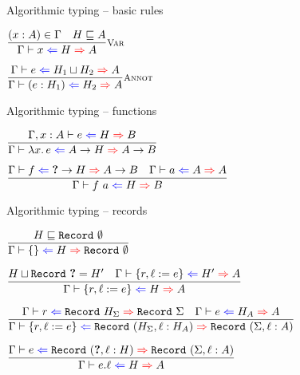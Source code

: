 \documentclass{beamer}
\begin{document}
\begin{frame}{Algorithmic typing -- basic rules}

\begin{center}
  $\infrule[Var]{\sidecond{(x : A) \in \Gamma} \quad \sidecond{\hintorder{H}{A}}}{\hinting{x}{H}{A}}$

  \vspace{2em}

  $\infrule[Annot]{\hinting{e}{\hintlub{H_1}{H_2}}{A}}{\hinting{\annot{e}{H_1}}{H_2}{A}}$
\end{center}

\end{frame}

\begin{frame}{Algorithmic typing -- functions}

\begin{center}
  $\infrule{\fullhinting{\extend{\Gamma}{x}{A}}{e}{H}{B}}{\hinting{\fun{x}{e}}{\Fun{A}{H}}{\Fun{A}{B}}}$

  \vspace{2em}

  $\infrule{\hinting{f}{\Fun{\Hole}{H}}{\Fun{A}{B}} \quad \hinting{a}{A}{A}}{\hinting{\app{f}{a}}{H}{B}}$
\end{center}

\end{frame}


\begin{frame}{Algorithmic typing -- records}

\begin{center}
  $\infrule{\hintorder{H}{\Record{\emptysig}}}{\hinting{\emptyrecord}{H}{\Record{\emptysig}}}$

  \vspace{2em}


  $\infrule{\sidecond{\hintlub{H}{\Record{\Hole}} = H'} \quad \hinting{\extendrecord{r}{\ell}{e}}{H'}{A}}{\hinting{\extendrecord{r}{\ell}{e}}{H}{A}}$

  \vspace{2em}

  $\infrule{\hinting{r}{\Record{H_\Sigma}}{\Record{\Sigma}} \quad \hinting{e}{H_A}{A}}{\hinting{\extendrecord{r}{\ell}{e}}{\Record{(\extendsig{H_\Sigma}{\ell}{H_A})}}{\Record{(\extendsig{\Sigma}{\ell}{A})}}}$

  \vspace{2em}

  $\infrule{\hinting{e}{\Record{(\extendsig{\Hole}{\ell}{H})}}{\Record{(\extendsig{\Sigma}{\ell}{A})}}}{\hinting{\proj{e}{\ell}}{H}{A}}$
\end{center}

\end{frame}
\end{document}
